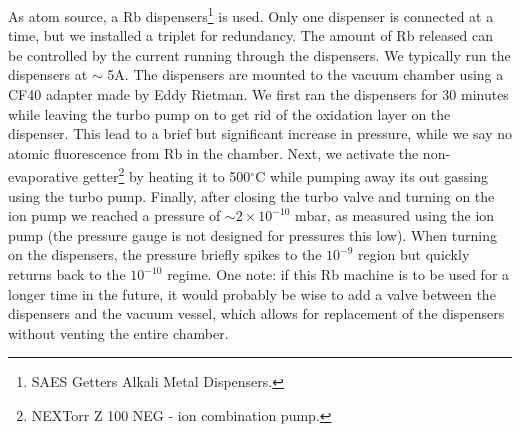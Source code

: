 As atom source, a Rb dispensers\footnote{SAES Getters Alkali Metal Dispensers.} is used.
Only one dispenser is connected at a time, but we installed a triplet for redundancy.
The amount of Rb released can be controlled by the current running through the dispensers.
We typically run the dispensers at $\sim$ 5A.
The dispensers are mounted to the vacuum chamber using a CF40 adapter made by Eddy Rietman.
We first ran the dispensers for 30 minutes while leaving the turbo pump on to get rid of the oxidation layer on the dispenser.
This lead to a brief but significant increase in pressure, while we say no atomic fluorescence from Rb in the chamber.  
Next, we activate the non-evaporative getter\footnote{NEXTorr Z 100 NEG - ion combination pump.} by heating it to 500${}^{\circ}$C while pumping away its out gassing using the turbo pump. Finally, after closing the turbo valve and turning on the ion pump we reached a pressure of $\sim 2\times 10^{-10}$ mbar, as measured using the ion pump (the pressure gauge is not designed for pressures this low).
When turning on the dispensers, the pressure briefly spikes to the $10^{-9}$ region but quickly returns back to the $10^{-10}$ regime.
One note: if this Rb machine is to be used for a longer time in the future, it would probably be wise to add a valve between the dispensers and the vacuum vessel, which allows for replacement of the dispensers without venting the entire chamber. 


